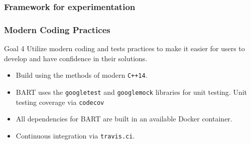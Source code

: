 \documentclass[xcolor=x11names, compress]{beamer}
\begin{document}
\begin{frame}
  \frametitle{Framework for experimentation}
\end{frame}

\begin{frame}
  \frametitle{Modern Coding Practices}
  \begin{block}{Goal 4}
    Utilize modern coding and tests practices to make it
    easier for users to develop and have confidence in their solutions.
  \end{block}
  \begin{itemize}
  \item Build using the methods of modern \texttt{C++14}.
  \item BART uses the \texttt{googletest} and \texttt{googlemock}
    libraries for unit testing. Unit testing coverage via \texttt{codecov}
  \item All dependencies for BART are built in an available Docker
    container.
  \item Continuous integration via \texttt{travis.ci}.
  \end{itemize}  
    
\end{frame}
\end{document}
